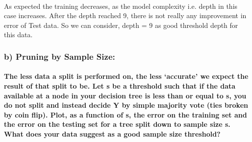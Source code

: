 \documentclass[11pt]{article}
\begin{document}
    \begin{center}
    \end{center}
    { \hspace*{\fill} \\}
    
    As expected the training decreases, as the model complexity i.e. depth
in this case increases. After the depth reached 9, there is not really
any improvement in error of Test data. So we can consider, depth = 9 as
good threshold depth for this data.

    \subsubsection{b) Pruning by Sample
Size:}\label{b-pruning-by-sample-size}

\paragraph{The less data a split is performed on, the less `accurate' we
expect the result of that split to be. Let s be a threshold such that if
the data available at a node in your decision tree is less than or equal
to s, you do not split and instead decide Y by simple majority vote
(ties broken by coin flip). Plot, as a function of s, the error on the
training set and the error on the testing set for a tree split down to
sample size s. What does your data suggest as a good sample size
threshold?}\label{the-less-data-a-split-is-performed-on-the-less-accurate-we-expect-the-result-of-that-split-to-be.-let-s-be-a-threshold-such-that-if-the-data-available-at-a-node-in-your-decision-tree-is-less-than-or-equal-to-s-you-do-not-split-and-instead-decide-y-by-simple-majority-vote-ties-broken-by-coin-flip.-plot-as-a-function-of-s-the-error-on-the-training-set-and-the-error-on-the-testing-set-for-a-tree-split-down-to-sample-size-s.-what-does-your-data-suggest-as-a-good-sample-size-threshold}
\end{document}
